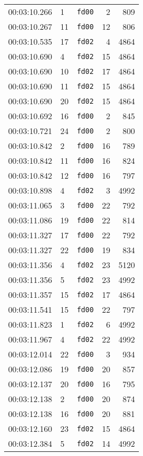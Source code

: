 \documentclass{article}
\begin{document}
\begin{longtable}{lllrr}
00:03:10.266 & 1 & \texttt{fd00} & 2 & 809 \\
00:03:10.267 & 11 & \texttt{fd00} & 12 & 806 \\
00:03:10.535 & 17 & \texttt{fd02} & 4 & 4864 \\
00:03:10.690 & 4 & \texttt{fd02} & 15 & 4864 \\
00:03:10.690 & 10 & \texttt{fd02} & 17 & 4864 \\
00:03:10.690 & 11 & \texttt{fd02} & 15 & 4864 \\
00:03:10.690 & 20 & \texttt{fd02} & 15 & 4864 \\
00:03:10.692 & 16 & \texttt{fd00} & 2 & 845 \\
00:03:10.721 & 24 & \texttt{fd00} & 2 & 800 \\
00:03:10.842 & 2 & \texttt{fd00} & 16 & 789 \\
00:03:10.842 & 11 & \texttt{fd00} & 16 & 824 \\
00:03:10.842 & 12 & \texttt{fd00} & 16 & 797 \\
00:03:10.898 & 4 & \texttt{fd02} & 3 & 4992 \\
00:03:11.065 & 3 & \texttt{fd00} & 22 & 792 \\
00:03:11.086 & 19 & \texttt{fd00} & 22 & 814 \\
00:03:11.327 & 17 & \texttt{fd00} & 22 & 792 \\
00:03:11.327 & 22 & \texttt{fd00} & 19 & 834 \\
00:03:11.356 & 4 & \texttt{fd02} & 23 & 5120 \\
00:03:11.356 & 5 & \texttt{fd02} & 23 & 4992 \\
00:03:11.357 & 15 & \texttt{fd02} & 17 & 4864 \\
00:03:11.541 & 15 & \texttt{fd00} & 22 & 797 \\
00:03:11.823 & 1 & \texttt{fd02} & 6 & 4992 \\
00:03:11.967 & 4 & \texttt{fd02} & 22 & 4992 \\
00:03:12.014 & 22 & \texttt{fd00} & 3 & 934 \\
00:03:12.086 & 19 & \texttt{fd00} & 20 & 857 \\
00:03:12.137 & 20 & \texttt{fd00} & 16 & 795 \\
00:03:12.138 & 2 & \texttt{fd00} & 20 & 874 \\
00:03:12.138 & 16 & \texttt{fd00} & 20 & 881 \\
00:03:12.160 & 23 & \texttt{fd02} & 15 & 4864 \\
00:03:12.384 & 5 & \texttt{fd02} & 14 & 4992 \\

\end{longtable}
\end{document}
